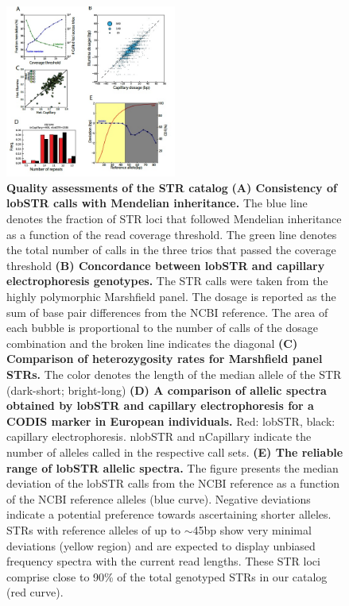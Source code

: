 \begin{figure}[h!]
\centering
\label{fig:catfig2}
\includegraphics[width=0.5\textwidth]{Figures/Chapter3/Fig2.jpg}
\caption{\textbf{Quality assessments of the STR catalog} \textbf{(A) Consistency of lobSTR calls with Mendelian inheritance.} The blue line denotes the fraction of STR loci that followed Mendelian inheritance as a function of the read coverage threshold. The green line denotes the total number of calls in the three trios that passed the coverage threshold \textbf{(B) Concordance between lobSTR and capillary electrophoresis genotypes.} The STR calls were taken from the highly polymorphic Marshfield panel. The dosage is reported as the sum of base pair differences from the NCBI reference. The area of each bubble is proportional to the number of calls of the dosage combination and the broken line indicates the diagonal \textbf{(C) Comparison of heterozygosity rates for Marshfield panel STRs.} The color denotes the length of the median allele of the STR (dark-short; bright-long) \textbf{(D) A comparison of allelic spectra obtained by lobSTR and capillary electrophoresis for a CODIS marker in European individuals.} Red: lobSTR, black: capillary electrophoresis. nlobSTR and nCapillary indicate the number of alleles called in the respective call sets. \textbf{(E) The reliable range of lobSTR allelic spectra.} The figure presents the median deviation of the lobSTR calls from the NCBI reference as a function of the NCBI reference alleles (blue curve). Negative deviations indicate a potential preference towards ascertaining shorter alleles. STRs with reference alleles of up to $\sim$45bp show very minimal deviations (yellow region) and are expected to display unbiased frequency spectra with the current read lengths. These STR loci comprise close to 90\% of the total genotyped STRs in our catalog (red curve).}
\end{figure}

